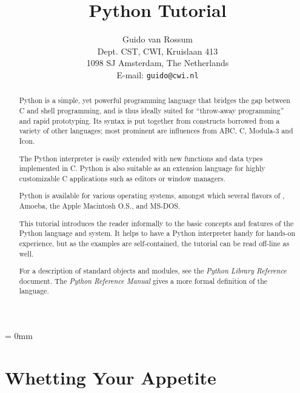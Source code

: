 
\title{\bf
	Python Tutorial
}
	
\author{
	Guido van Rossum \\
	Dept. CST, CWI, Kruislaan 413 \\
	1098 SJ Amsterdam, The Netherlands \\
	E-mail: {\tt guido@cwi.nl}
}




\maketitle

\begin{abstract}

\noindent
Python is a simple, yet powerful programming language that bridges the
gap between C and shell programming, and is thus ideally suited for
``throw-away programming''
and rapid prototyping.  Its syntax is put
together from constructs borrowed from a variety of other languages;
most prominent are influences from ABC, C, Modula-3 and Icon.

The Python interpreter is easily extended with new functions and data
types implemented in C.  Python is also suitable as an extension
language for highly customizable C applications such as editors or
window managers.

Python is available for various operating systems, amongst which
several flavors of {\UNIX}, Amoeba, the Apple Macintosh O.S.,
and MS-DOS.

This tutorial introduces the reader informally to the basic concepts
and features of the Python language and system.  It helps to have a
Python interpreter handy for hands-on experience, but as the examples
are self-contained, the tutorial can be read off-line as well.

For a description of standard objects and modules, see the {\em Python
Library Reference} document.  The {\em Python Reference Manual} gives
a more formal definition of the language.

\end{abstract}

\pagebreak
{
\parskip = 0mm
\tableofcontents
}

\pagebreak



\chapter{Whetting Your Appetite}


